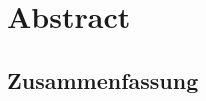 

\cleardoublepage
\chapter*{Abstract}

\begin{otherlanguage}{german}
\cleardoublepage
\chapter*{Zusammenfassung}
\end{otherlanguage}

